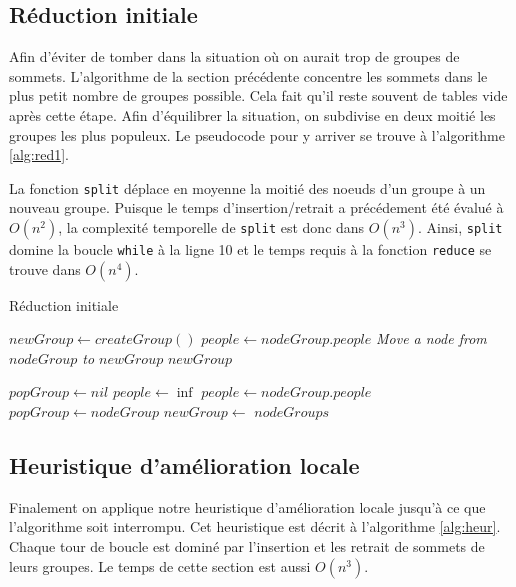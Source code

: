 \documentclass[letterpaper,12pt,final]{article}
\begin{document}
\subsection{Réduction initiale}

Afin d'éviter de tomber dans la situation où on aurait trop de groupes
de sommets. L'algorithme de la section précédente concentre les
sommets dans le plus petit nombre de groupes possible.  Cela fait
qu'il reste souvent de tables vide après cette étape.  Afin
d'équilibrer la situation, on subdivise en deux moitié les groupes les
plus populeux. Le pseudocode pour y arriver se trouve à l'algorithme
\ref{alg:red1}.

La fonction \lstinline|split| déplace en moyenne la moitié des noeuds
d'un groupe à un nouveau groupe. Puisque le temps d'insertion/retrait
a précédement été évalué à $O(n^2)$, la complexité temporelle de
\lstinline|split| est donc dans $O(n^3)$.  Ainsi, \lstinline|split|
domine la boucle \lstinline|while| à la ligne 10 et le temps requis à
la fonction \lstinline|reduce| se trouve dans $O(n^4)$.


\begin{algorithm}
  \caption{Réduction initiale}
  \label{alg:red1}
  \begin{algorithmic}[1]
     
    \State $newGroup \gets createGroup()$
    \State $people \gets nodeGroup.people$
    \State \textit{Move a node from $nodeGroup$ to $newGroup$}
    \State \Return $newGroup$
    \EndWhile
    \EndFunction

    \State $popGroup \gets nil$
    \State $people \gets \inf$    
    \State $people \gets nodeGroup.people$
    \State $popGroup \gets nodeGroup$
    \EndIf
    \EndFor
    \State $newGroup \gets$  
    \EndWhile
    \State \Return $nodeGroups$
    \EndFunction
  \end{algorithmic}
\end{algorithm}



\subsection{Heuristique d'amélioration locale}

Finalement on applique notre heuristique d'amélioration locale jusqu'à
ce que l'algorithme soit interrompu. Cet heuristique est décrit à
l'algorithme \ref{alg:heur}. Chaque tour de boucle est dominé par
l'insertion et les retrait de sommets de leurs groupes. Le temps de cette section est aussi $O(n^3)$.
\end{document}
